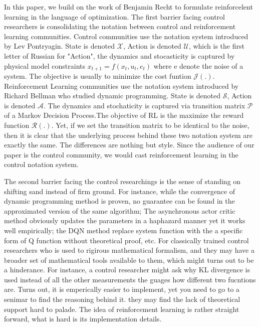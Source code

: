 \documentclass[journal]{IEEEtran}
\begin{document}
In this paper, we build on the work of Benjamin Recht \cite{Recht2018ATO} to formulate reinforcelent learning in the language of optimization. The first barrier facing control researchers is consolidating the notation between control and reinforcement learning communities. Control communities use the notation system introduced by Lev Pontryagin. State is denoted $ \mathcal{X}$, Action is denoted $\mathcal{U}$, which is the first letter of Russian for "Action", the dynamics and stocasticity is captured by physical model constraints $x_{t+1}=f(x_t,u_t,e_t)$ where e denote the noise of a system. The objective is usually to minimize the cost funtion $\mathcal{J(.)}$. Reinforcement Learning communities use the notation system introduced by Richard Bellman who studied dynamic programming. State is denoted $\mathcal{S}$, Action is denoted $\mathcal{A}$. The dynamics and stochaticity is captured via transition matrix $\mathcal{P}$ of a Markov Decision Process.The objective of RL is the maximize the reward function $\mathcal{R(.)}$. Yet, if we set the transition matrix to be identical to the noise, then it is clear that the underlying process behind these two notation system are exactly the same. The differences are nothing but style. Since the audience of our paper is the control community, we would cast reinforcement learning in the control notation system.

The second barrier facing the control researchings is the sense of standing on shifting sand instead of firm ground. For instance, while the convergence of dynamic programming method is proven, no guarantee can be found in the approximated version of the same algorithm; The asynchronous actor critic method obviously updates the parameters in a haphazard manner yet it works well empirically; the DQN method replace system function with the a specific form of Q function without theoretical proof, etc. For classically trained control researchers who is used to rigirous mathematical formalism, and they may have a broader set of mathematical tools available to them, which might turns out to be a hinderance. For instance, a control researcher might ask why KL divergence is used instead of all the other measurements the guages how different two fucntions are. Turns out, it is emperically easier to implement, yet you need to go to a senimar to find the reasoning behind it. they may find the lack of theoretical support hard to palade. The idea of reinforcement learning is rather straight forward, what is hard is its implementation details.
\end{document}
